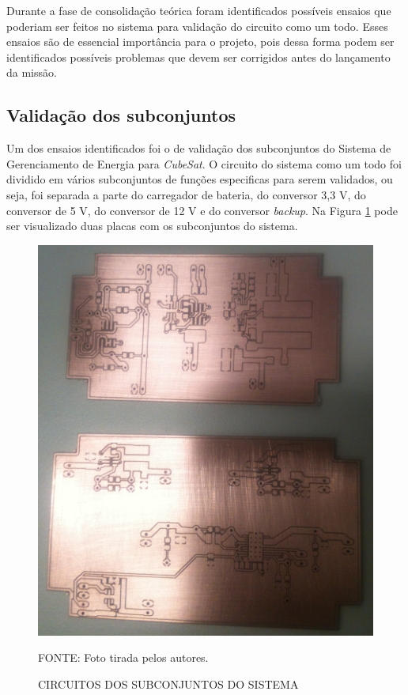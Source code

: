 \documentclass[
	12pt,				%
	openright,			%
	oneside,			%
	a4paper,			%
	english,			%
	french,				%
	spanish,			%
	brazil,				%
	oldfontcommands
	]{abntex2}
\begin{document}
	Durante a fase de consolidação teórica foram identificados possíveis ensaios que poderiam ser feitos no sistema para validação do circuito como um todo. Esses ensaios são de essencial importância para o projeto, pois dessa forma podem ser identificados possíveis problemas que devem ser corrigidos antes do lançamento da missão.
	
\subsection[Validação dos subconjuntos]{Validação dos subconjuntos}

	Um dos ensaios identificados foi o de validação dos subconjuntos do Sistema de Gerenciamento de Energia para \textit{CubeSat}. O circuito do sistema como um todo foi dividido em vários subconjuntos de funções especificas para serem validados, ou seja, foi separada a parte do carregador de bateria, do conversor 3,3 V, do conversor de 5 V, do conversor de 12 V e do conversor \textit{backup}. Na Figura \ref{Fig_SubConj} pode ser visualizado duas placas com os subconjuntos do sistema.
	
	\begin{figure}[th]
		\caption{CIRCUITOS DOS SUBCONJUNTOS DO SISTEMA}
		\label{Fig_SubConj}
		\centering
		\includegraphics[width=0.7\linewidth]{./figs/placas_subconjuntos}
			
		\begin{small}
			FONTE: Foto tirada pelos autores.
		\end{small}		
	\end{figure}
	
\end{document}
